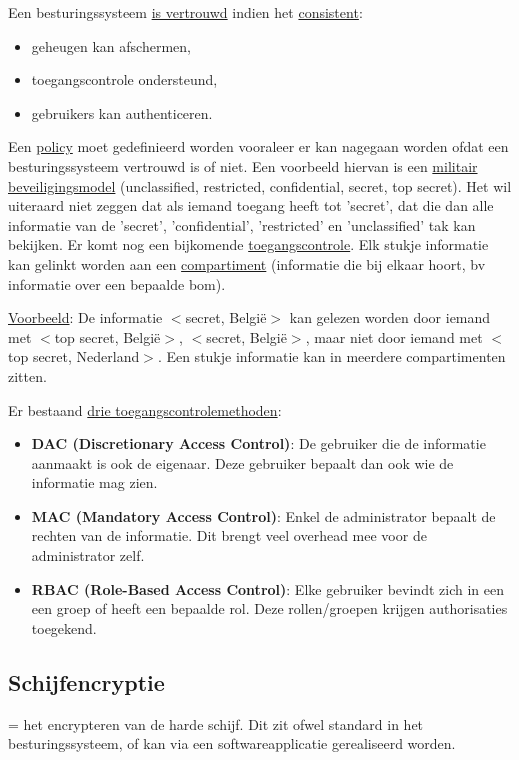 \documentclass{report}
\begin{document}
	Een besturingssysteem \underline{is vertrouwd} indien het \underline{consistent}:
	\begin{itemize}
		\item geheugen kan afschermen,
		\item toegangscontrole ondersteund,
		\item gebruikers kan authenticeren.
	\end{itemize}

	Een \underline{policy} moet gedefinieerd worden vooraleer er kan nagegaan worden ofdat een besturingssysteem vertrouwd is of niet. Een voorbeeld hiervan is een \underline{militair beveiligingsmodel} (unclassified, restricted, confidential, secret, top secret). Het wil uiteraard niet zeggen dat als iemand toegang heeft tot 'secret', dat die dan alle informatie van de 'secret', 'confidential', 'restricted' en 'unclassified' tak kan bekijken. Er komt nog een bijkomende \underline{toegangscontrole}. Elk stukje informatie kan gelinkt worden aan een \underline{compartiment} (informatie die bij elkaar hoort, bv informatie over een bepaalde bom).
	
	\underline{Voorbeeld}: De informatie $<$secret, België$>$ kan gelezen worden door iemand met $<$top secret, België$>$, $<$secret, België$>$, maar niet door iemand met $<$top secret, Nederland$>$. Een stukje informatie kan in meerdere compartimenten zitten.

	Er bestaand \underline{drie toegangscontrolemethoden}:
	\begin{itemize}
		\item \textbf{DAC (Discretionary Access Control)}: De gebruiker die de informatie aanmaakt is ook de eigenaar. Deze gebruiker bepaalt dan ook wie de informatie mag zien. 
		\item \textbf{MAC (Mandatory Access Control)}: Enkel de administrator bepaalt de rechten van de informatie. Dit brengt veel overhead mee voor de administrator zelf.
		\item \textbf{RBAC (Role-Based Access Control)}: Elke gebruiker bevindt zich in een een groep of heeft een bepaalde rol. Deze rollen/groepen krijgen authorisaties toegekend. 
	\end{itemize}


	\subsection{Schijfencryptie}
	= het encrypteren van de harde schijf. Dit zit ofwel standard in het besturingssysteem, of kan via een softwareapplicatie gerealiseerd worden.
\end{document}
